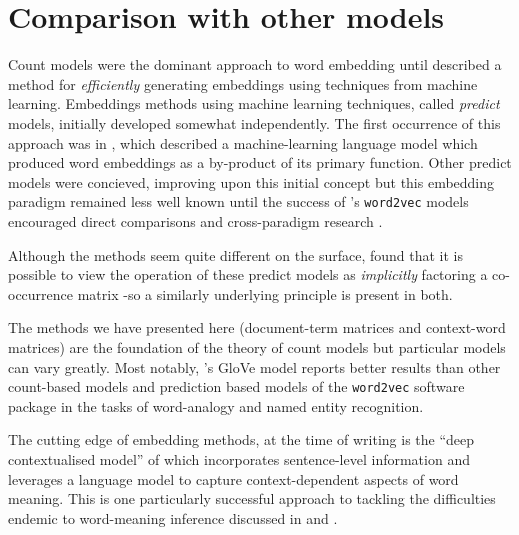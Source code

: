 \section{Comparison with other models}
\vspace{-1em}
Count models were the dominant approach to word embedding until \textcite{mikolov13-effic-estim-word-repres-vector-space} described a method for \emph{efficiently} generating embeddings using techniques from machine learning. Embeddings methods using machine learning techniques, called \emph{predict} models, initially developed somewhat independently. The first occurrence of this approach was in \parencite{bengio-2003-a-neural-prob-lang-model}, which described a machine-learning language model which produced word embeddings as a by-product of its primary function. Other predict models were concieved, improving upon this initial concept \parencite{morin-2005-hierarchical-probabilistic, mnih-2007-three-new-graphical-models, collobert-2008-a-unified-architecture} but this embedding paradigm remained less well known until the success of \citeauthor{mikolov13-effic-estim-word-repres-vector-space}'s \parencite*{mikolov13-effic-estim-word-repres-vector-space} \texttt{word2vec} models encouraged direct comparisons and cross-paradigm research \parencite{baroni-etal-2014-dont, levy-2014-neural-WE-as}.

Although the methods seem quite different on the surface, \textcite{levy-2014-neural-WE-as} found that it is possible to view the operation of these predict models as \emph{implicitly} factoring a co-occurrence matrix -so a similarly underlying principle is present in both.

The methods we have presented here (document-term matrices and context-word matrices) are the foundation of the theory of count models but particular models can vary greatly. Most notably, \citeauthor{pennington2014glove}'s \parencite*{pennington2014glove} GloVe model reports better results than other count-based models and prediction based models of the \texttt{word2vec} software package in the tasks of word-analogy and named entity recognition.

The cutting edge of embedding methods, at the time of writing is the ``deep contextualised model'' of \textcite{peters18-deep-contex-word-repres} which incorporates sentence-level information and leverages a language model to capture context-dependent aspects of word meaning. This is one particularly successful approach to tackling the difficulties endemic to word-meaning inference discussed in  and .

